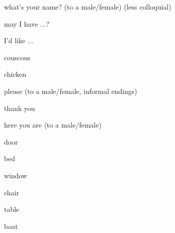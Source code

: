 \begin{flashcard}{\LARGE what's your name? (to a male/female) (less colloquial)}
\LARGE {}
\end{flashcard}
\begin{flashcard}{\LARGE may I have ...?}
\LARGE {}
\end{flashcard}
\begin{flashcard}{\LARGE I'd like ...}
\LARGE {}
\end{flashcard}
\begin{flashcard}{\LARGE couscous}
\LARGE {}
\end{flashcard}
\begin{flashcard}{\LARGE chicken}
\LARGE {}
\end{flashcard}
\begin{flashcard}{\LARGE please (to a male/female, informal endings)}
\LARGE {}
\end{flashcard}
\begin{flashcard}{\LARGE thank you}
\LARGE {}
\end{flashcard}
\begin{flashcard}{\LARGE here you are (to a male/female)}
\LARGE {}
\end{flashcard}
\begin{flashcard}{\LARGE door}
\LARGE {}
\end{flashcard}
\begin{flashcard}{\LARGE bed}
\LARGE {}
\end{flashcard}
\begin{flashcard}{\LARGE window}
\LARGE {}
\end{flashcard}
\begin{flashcard}{\LARGE chair}
\LARGE {}
\end{flashcard}
\begin{flashcard}{\LARGE table}
\LARGE {}
\end{flashcard}
\begin{flashcard}{\LARGE boat}
\LARGE {}
\end{flashcard}

